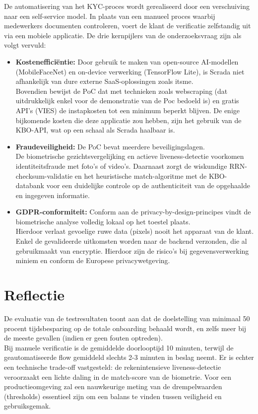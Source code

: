 De automatisering van het KYC-proces wordt gerealiseerd door een verschuiving naar een self-service model. In plaats van een manueel proces waarbij medewerkers documenten controleren, voert de klant de verificatie zelfstandig uit via een mobiele applicatie.
De drie kernpijlers van de onderzoeksvraag zijn als volgt vervuld:

\begin{itemize}
    \item \textbf{Kostenefficiëntie:} Door gebruik te maken van open-source AI-modellen (MobileFaceNet) en on-device verwerking (TensorFlow Lite), is Scrada niet afhankelijk van dure externe SaaS-oplossingen zoals itsme. \\ Bovendien bewijst de PoC dat met technieken zoals webscraping (dat uitdrukkelijk enkel voor de demonstratie van de Poc bedoeld is) 
    en gratis API's (VIES) de instapkosten tot een minimum beperkt blijven. De enige bijkomende kosten die deze applicatie zou hebben, zijn het gebruik van de KBO-API, wat op een schaal als Scrada haalbaar is.
    \item \textbf{Fraudeveiligheid:} De PoC bevat meerdere beveiligingslagen. \\ De biometrische gezichtsvergelijking en actieve liveness-detectie voorkomen identiteitsfraude met foto's of video's. Daarnaast zorgt de wiskundige RRN-checksum-validatie en het heuristische match-algoritme met de KBO-databank voor een duidelijke controle op de authenticiteit van de opgehaalde en ingegeven informatie.
    \item \textbf{GDPR-conformiteit:} Conform aan de privacy-by-design-principes vindt de biometrische analyse volledig lokaal op het toestel plaats. \\ Hierdoor verlaat gevoelige ruwe data (pixels) nooit het apparaat van de klant. Enkel de gevalideerde uitkomsten worden naar de backend verzonden, die al gebruikmaakt van encryptie. Hierdoor zijn de risico's bij gegevensverwerking miniem en conform de Europese privacywetgeving.
\end{itemize}

\section{Reflectie}
De evaluatie van de testresultaten toont aan dat de doelstelling van minimaal 50 procent tijdsbesparing op de totale onboarding behaald wordt, en zelfs meer bij de meeste gevallen (indien er geen fouten optreden). 
\\ Bij manuele verificatie is de gemiddelde doorlooptijd 10 minuten, terwijl de geautomatiseerde flow gemiddeld slechts 2-3 minuten in beslag neemt.
Er is echter een technische trade-off vastgesteld: de rekenintensieve liveness-detectie veroorzaakt een lichte daling in de match-score van de biometrie. 
Voor een productieomgeving zal een nauwkeurige meting van de drempelwaarden (thresholds) essentieel zijn om een balans te vinden tussen veiligheid en gebruiksgemak.

